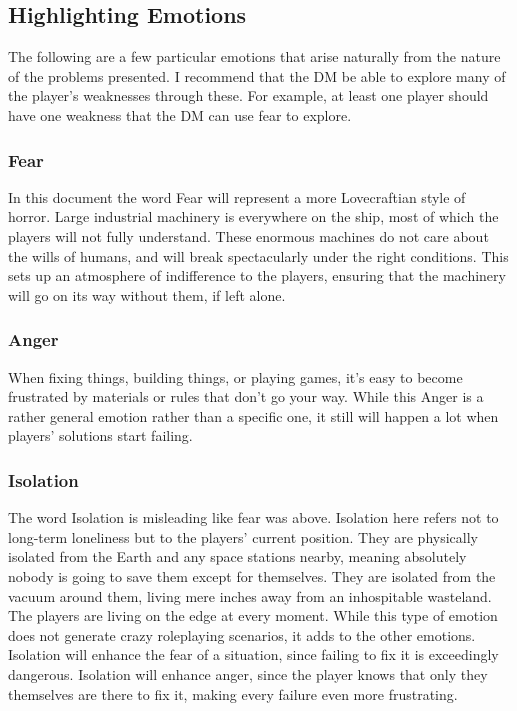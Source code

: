 \documentclass[a4paper]{article}
\begin{document}
\subsection{Highlighting Emotions}

The following are a few particular emotions that arise naturally from the nature of the problems presented. I recommend that the DM be able to explore many of the player's weaknesses through these. For example, at least one player should have one weakness that the DM can use fear to explore.

\subsubsection{Fear} \label{fear}

In this document the word Fear will represent a more Lovecraftian style of horror. Large industrial machinery is everywhere on the ship, most of which the players will not fully understand. These enormous machines do not care about the wills of humans, and will break spectacularly under the right conditions. This sets up an atmosphere of indifference to the players, ensuring that the machinery will go on its way without them, if left alone. 

\subsubsection{Anger} \label{anger}

When fixing things, building things, or playing games, it's easy to become frustrated by materials or rules that don't go your way. While this Anger is a rather general emotion rather than a specific one, it still will happen a lot when players' solutions start failing. 

\subsubsection{Isolation} \label{isolation}

The word Isolation is misleading like fear was above. Isolation here refers not to long-term loneliness but to the players' current position. They are physically isolated from the Earth and any space stations nearby, meaning absolutely nobody is going to save them except for themselves. They are isolated from the vacuum around them, living mere inches away from an inhospitable wasteland. The players are living on the edge at every moment. While this type of emotion does not generate crazy roleplaying scenarios, it adds to the other emotions. Isolation will enhance the fear of a situation, since failing to fix it is exceedingly dangerous. Isolation will enhance anger, since the player knows that only they themselves are there to fix it, making every failure even more frustrating. 
\end{document}
